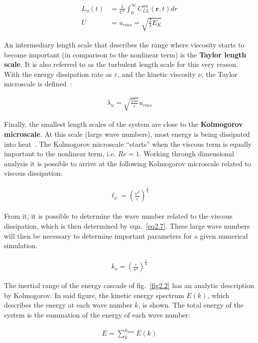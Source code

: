\documentclass[12pt,a4paper]{report}
\begin{document}
\begin{align}
 L_u(t) &= \frac{1}{U^2} \int_0^\infty C_{LL}^{uu}(\bm r, t) dr \nonumber \\
 U&=u_{rms}=\sqrt{\frac{2}{3}E_K} \nonumber
\end{align}

An intermediary length scale that describes the range where viscosity starts to become important (in comparison to the nonlinear term) is the \textbf{Taylor length scale}. It is also referred to as the turbulent length scale for this very reason. With the energy dissipation rate as $\varepsilon$, and the kinetic viscosity $\nu$, the Taylor microscale is defined~\cite{LinkmannMoritzFrederikLeon2016Spim}:

\begin{align}
 \lambda_u = \sqrt{\frac{15 \nu}{\varepsilon}} u_{rms} \nonumber
\end{align}

Finally, the smallest length scales of the system are close to the \textbf{Kolmogorov microscale}. At this scale (large wave numbers), most energy is being dissipated into heat~\cite{mccomb1990physics}. The Kolmogorov microscale ``starts'' when the viscous term is equally important to the nonlinear term, i.e. $Re=1$. Working through dimensional analysis it is possible to arrive at the following Kolmogorov microscale related to viscous dissipation:

\begin{align}
 \ell_\nu = \left( \frac{\nu^3}{\varepsilon} \right)^{\frac{1}{4}} \nonumber
\end{align}

From it, it is possible to determine the wave number related to the viscous dissipation, which is then determined by eqn.~\ref{eq2.7}. These large wave numbers will then be necessary to determine important parameters for a given numerical simulation.

\begin{align}
 k_\nu = \left( \frac{\varepsilon}{\nu^3} \right)^{\frac{1}{4}} \label{eq2.7}
\end{align}

The inertial range of the energy cascade of fig.~\ref{fig2.2} has an analytic description by Kolmogorov. In said figure, the kinetic energy spectrum $E(k)$, which describes the energy at each wave number $k$, is shown. The total energy of the system is the summation of the energy of each wave number:

\begin{align}
 E = \sum_k^{k_{max}} E(k)
\end{align}
\end{document}
